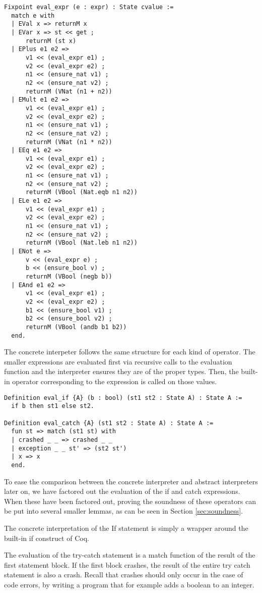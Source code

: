 \begin{verbatim}
Fixpoint eval_expr (e : expr) : State cvalue :=
  match e with
  | EVal x => returnM x
  | EVar x => st << get ;
      returnM (st x)
  | EPlus e1 e2 => 
      v1 << (eval_expr e1) ;
      v2 << (eval_expr e2) ;
      n1 << (ensure_nat v1) ;
      n2 << (ensure_nat v2) ;
      returnM (VNat (n1 + n2))
  | EMult e1 e2 =>
      v1 << (eval_expr e1) ;
      v2 << (eval_expr e2) ;
      n1 << (ensure_nat v1) ;
      n2 << (ensure_nat v2) ;
      returnM (VNat (n1 * n2))
  | EEq e1 e2 =>
      v1 << (eval_expr e1) ;
      v2 << (eval_expr e2) ;
      n1 << (ensure_nat v1) ;
      n2 << (ensure_nat v2) ;
      returnM (VBool (Nat.eqb n1 n2))
  | ELe e1 e2 =>
      v1 << (eval_expr e1) ;
      v2 << (eval_expr e2) ;
      n1 << (ensure_nat v1) ;
      n2 << (ensure_nat v2) ;
      returnM (VBool (Nat.leb n1 n2))
  | ENot e =>
      v << (eval_expr e) ;
      b << (ensure_bool v) ;
      returnM (VBool (negb b))
  | EAnd e1 e2 =>
      v1 << (eval_expr e1) ;
      v2 << (eval_expr e2) ;
      b1 << (ensure_bool v1) ;
      b2 << (ensure_bool v2) ;
      returnM (VBool (andb b1 b2))
  end.
\end{verbatim}

The concrete interpeter follows the same structure for each kind of operator.
The smaller expressions are evaluated first via recursive calls to the
evaluation function and the interpreter
ensures they are of the proper types. Then, the built-in operator corresponding
to the expression is called on those values.

\begin{verbatim}
Definition eval_if {A} (b : bool) (st1 st2 : State A) : State A := 
  if b then st1 else st2.

Definition eval_catch {A} (st1 st2 : State A) : State A :=
  fun st => match (st1 st) with
  | crashed _ _ => crashed _ _
  | exception _ _ st' => (st2 st')
  | x => x
  end.
\end{verbatim}
To ease the comparison between the concrete interpreter and abstract
interpreters later on, we have factored out the evaluation of the if and catch
expressions. When these have been factored out, proving the soundness of these
operators can be put into several smaller lemmas, as can be seen in Section
\ref{sec:soundness}.

The concrete interpretation of the If statement is simply a wrapper around the
built-in if construct of Coq. 

The evaluation of the try-catch statement is a
match function of the result of the first statement block. If the first block
crashes, the result of the entire try catch statement is also a crash. Recall
that crashes should only occur in the case of code errors, by writing
a program that for example adds a boolean to an integer.


